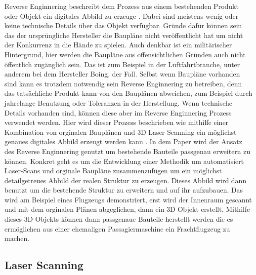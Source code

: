 \documentclass[../main.tex]{subfiles}
\begin{document}
Reverse Enginnering beschreibt dem Prozess aus einem bestehenden Produkt 
oder Objekt ein digitales Abbild zu erzeuge \cite{Helle.2021}.
Dabei sind meistens wenig oder keine technische Details über das Objekt
verfügbar. Gründe dafür können sein das der ursprüngliche Hersteller
die Baupläne nicht veröffentlicht hat um nicht der Konkurrenz in die Hände
zu spielen. Auch denkbar ist ein militärischer Hintergrund, hier werden
die Baupläne aus offensichtlichen Gründen auch nicht öffentlich zugänglich
sein. Das ist zum Beispiel in der Luftfahrtbranche, unter anderem bei dem
Hersteller Boing, der Fall. 
Selbst wenn Baupläne vorhanden sind kann es trotzdem notwendig sein 
Reverse Enginnering zu betreiben, denn das tatsächliche Produkt kann von
den Bauplänen abweichen, zum Beispiel durch jahrelange Benutzung oder
Toleranzen in der Herstellung. Wenn technische Details vorhanden sind,
können diese aber im Reverse Enginnering Prozess verwendet werden.
Hier wird dieser Prozess beschrieben wie mithilfe einer Kombination von
orginalen Bauplänen und 3D Laser Scanning ein möglichst genaues digitales
Abbild erzeugt werden kann \cite{Monchinger.2021}.
In dem Paper wird der Ansatz des Reverse Enginnering genutzt um
bestehende Bauteile passgenau erweitern zu können. Konkret geht es um die
Entwicklung einer Methodik um automatisiert Laser-Scans und orginale Baupläne
zusammenzufügen um ein möglichst detailgetreues Abbild der realen Struktur zu
erzeugen. Dieses Abbild wird dann benutzt um die bestehende Struktur zu 
erweitern und auf ihr aufzubauen. Das wird am Beispiel eines Flugzeugs 
demonstriert, erst wird der Innenraum gescannt und mit dem orginalen Plänen
abgeglichen, dann ein 3D Objekt erstellt. Mithilfe dieses 3D Objekts können 
dann passgenaue Bauteile herstellt werden die es ermöglichen aus einer ehemaligen
Passagiermaschine ein Frachtflugzeug zu machen.



\subsection{Laser Scanning}
\end{document}
